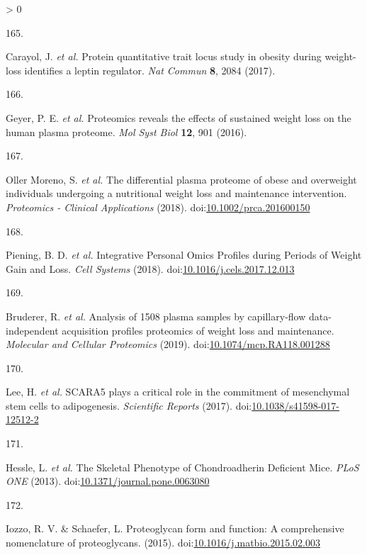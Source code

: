 \documentclass[11pt,twoside]{bristolthesis}
\newlength{\cslhangindent}
\newlength{\csllabelwidth}
\newenvironment{CSLReferences}[2] %
 {%
  \setlength{\parindent}{0pt}
  \ifodd #1 \everypar{\setlength{\hangindent}{\cslhangindent}}\ignorespaces\fi
  \ifnum #2 > 0
  \setlength{\parskip}{#2\baselineskip}
  \fi
 }%
 {}
\newcommand{\CSLLeftMargin}[1]{\parbox[t]{\csllabelwidth}{#1}}
\newcommand{\CSLRightInline}[1]{\parbox[t]{\linewidth - \csllabelwidth}{#1}\break}
\begin{document}
\begin{CSLReferences}{0}{0}
\leavevmode\hypertarget{ref-Carayol2017}{}%
\CSLLeftMargin{165. }
\CSLRightInline{Carayol, J. \emph{et al.} {Protein quantitative trait locus study in obesity during weight-loss identifies a leptin regulator}. \emph{Nat Commun} \textbf{8}, 2084 (2017).}

\leavevmode\hypertarget{ref-Geyer2016}{}%
\CSLLeftMargin{166. }
\CSLRightInline{Geyer, P. E. \emph{et al.} {Proteomics reveals the effects of sustained weight loss on the human plasma proteome}. \emph{Mol Syst Biol} \textbf{12}, 901 (2016).}

\leavevmode\hypertarget{ref-OllerMoreno2018}{}%
\CSLLeftMargin{167. }
\CSLRightInline{Oller Moreno, S. \emph{et al.} {The differential plasma proteome of obese and overweight individuals undergoing a nutritional weight loss and maintenance intervention}. \emph{Proteomics - Clinical Applications} (2018). doi:\href{https://doi.org/10.1002/prca.201600150}{10.1002/prca.201600150}}

\leavevmode\hypertarget{ref-Piening2018}{}%
\CSLLeftMargin{168. }
\CSLRightInline{Piening, B. D. \emph{et al.} {Integrative Personal Omics Profiles during Periods of Weight Gain and Loss}. \emph{Cell Systems} (2018). doi:\href{https://doi.org/10.1016/j.cels.2017.12.013}{10.1016/j.cels.2017.12.013}}

\leavevmode\hypertarget{ref-Bruderer2019}{}%
\CSLLeftMargin{169. }
\CSLRightInline{Bruderer, R. \emph{et al.} {Analysis of 1508 plasma samples by capillary-flow data-independent acquisition profiles proteomics of weight loss and maintenance}. \emph{Molecular and Cellular Proteomics} (2019). doi:\href{https://doi.org/10.1074/mcp.RA118.001288}{10.1074/mcp.RA118.001288}}

\leavevmode\hypertarget{ref-Lee2017a}{}%
\CSLLeftMargin{170. }
\CSLRightInline{Lee, H. \emph{et al.} {SCARA5 plays a critical role in the commitment of mesenchymal stem cells to adipogenesis}. \emph{Scientific Reports} (2017). doi:\href{https://doi.org/10.1038/s41598-017-12512-2}{10.1038/s41598-017-12512-2}}

\leavevmode\hypertarget{ref-Hessle2013}{}%
\CSLLeftMargin{171. }
\CSLRightInline{Hessle, L. \emph{et al.} {The Skeletal Phenotype of Chondroadherin Deficient Mice}. \emph{PLoS ONE} (2013). doi:\href{https://doi.org/10.1371/journal.pone.0063080}{10.1371/journal.pone.0063080}}

\leavevmode\hypertarget{ref-Iozzo2015}{}%
\CSLLeftMargin{172. }
\CSLRightInline{Iozzo, R. V. \& Schaefer, L. {Proteoglycan form and function: A comprehensive nomenclature of proteoglycans}. (2015). doi:\href{https://doi.org/10.1016/j.matbio.2015.02.003}{10.1016/j.matbio.2015.02.003}}


\end{CSLReferences}
\end{document}
